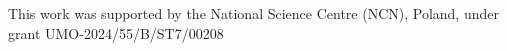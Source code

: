 This work was supported by the National Science Centre (NCN), Poland, under grant UMO-2024/55/B/ST7/00208